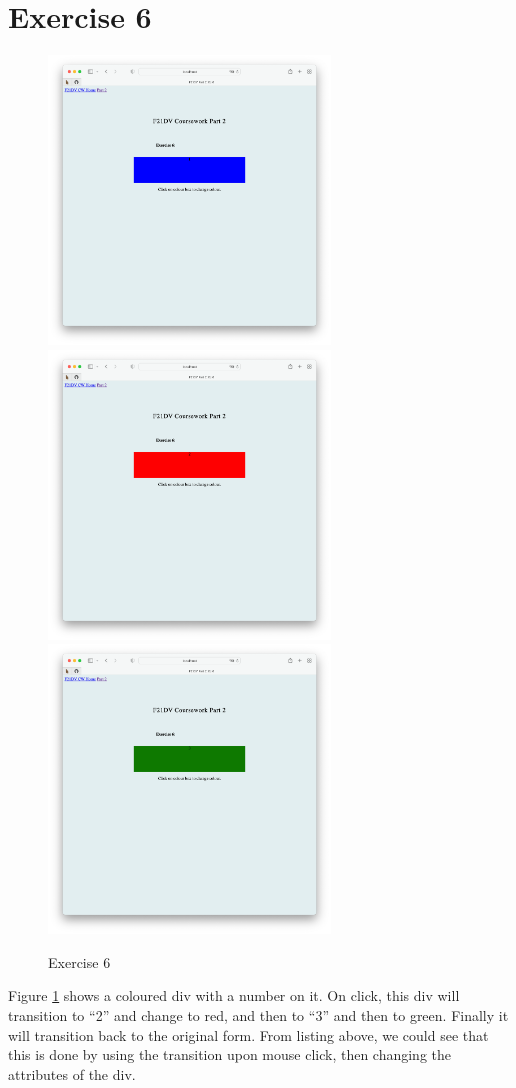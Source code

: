 \documentclass{scrreprt}
\begin{document}
\section{Exercise 6}
\begin{figure}[!ht]
    \centering
    \includegraphics[width = 7.5cm]{images/ex6_1.png}
    \includegraphics[width = 7.5cm]{images/ex6_2.png}
    \includegraphics[width = 7.5cm]{images/ex6_3.png}
    \label{fig:ex6}
    \caption{Exercise 6}
\end{figure}
\FloatBarrier

Figure \ref{fig:ex6} shows a coloured div with a number on it. On click, this div will transition to ``2'' and change to red, and then to ``3'' and then to green. Finally it will transition back to the original form. From listing above, we could see that this is done by using the transition upon mouse click, then changing the attributes of the div.
\end{document}
